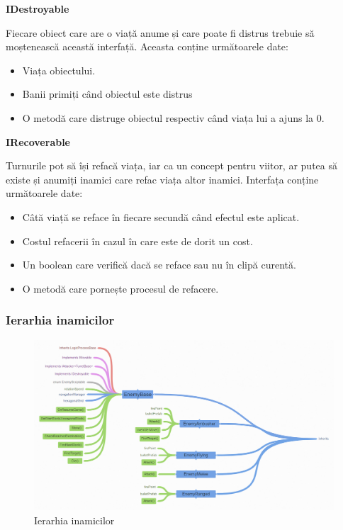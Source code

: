 \documentclass[12pt, a4paper]{article}
\begin{document}
	\textbf{IDestroyable}
	
	Fiecare obiect care are o viață anume și care poate fi distrus trebuie să moștenească această interfață. Aceasta conține următoarele date:
	
	\begin{itemize}
		\item Viața obiectului.
		\item Banii primiți când obiectul este distrus
		\item O metodă care distruge obiectul respectiv când viața lui a ajuns la 0.
	\end{itemize}
	\bigskip
	
	\textbf{IRecoverable}
	
	Turnurile pot să își refacă viața, iar ca un concept pentru viitor, ar putea să existe și anumiți inamici care refac viața altor inamici. Interfața conține următoarele date:
	
	\begin{itemize}
		\item Câtă viață se reface în fiecare secundă când efectul este aplicat.
		\item Costul refacerii în cazul în care este de dorit un cost.
		\item Un boolean care verifică dacă se reface sau nu în clipă curentă.
		\item O metodă care pornește procesul de refacere.
	\end{itemize}
	
	
	
	
	
	\subsubsection{Ierarhia inamicilor}
	
	\begin{figure}[H]
		\centering
		\includegraphics[width=1\textwidth]{EnemyHierarchy.png}
		\caption{Ierarhia inamicilor}
		\label{fig: enemyHierarchy}
	\end{figure}
\end{document}
